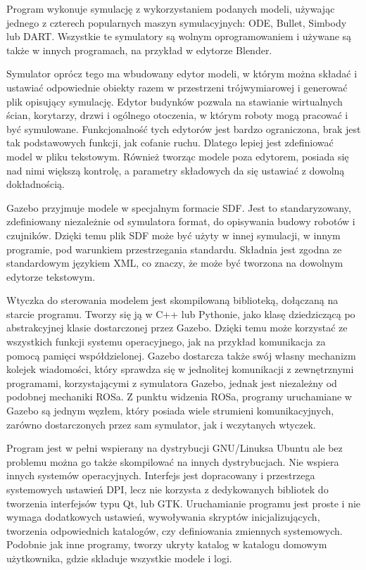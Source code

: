 	Program wykonuje symulację z wykorzystaniem podanych modeli, używając jednego z czterech popularnych maszyn symulacyjnych: ODE, Bullet, Simbody lub DART.
	Wszystkie te symulatory są wolnym oprogramowaniem i używane są także w innych programach, na przykład w edytorze Blender.

	Symulator oprócz tego ma wbudowany edytor modeli, w którym można składać i ustawiać odpowiednie obiekty razem w przestrzeni trójwymiarowej
	i generować plik opisujący symulację.
	Edytor budynków pozwala na stawianie wirtualnych ścian, korytarzy, drzwi i ogólnego otoczenia, w którym roboty mogą pracować i być symulowane.
	Funkcjonalność tych edytorów jest bardzo ograniczona, brak jest tak podstawowych funkcji, jak cofanie ruchu.
	Dlatego lepiej jest zdefiniować model w pliku tekstowym.
	Również tworząc modele poza edytorem, posiada się nad nimi większą kontrolę, a parametry składowych da się ustawiać z dowolną dokładnością.

	Gazebo przyjmuje modele w specjalnym formacie SDF. Jest to standaryzowany, zdefiniowany niezależnie od symulatora format, do opisywania budowy robotów i czujników.
	Dzięki temu plik SDF może być użyty w innej symulacji, w innym programie, pod warunkiem przestrzegania standardu.
	Składnia jest zgodna ze standardowym językiem XML, co znaczy, że może być tworzona na dowolnym edytorze tekstowym.

	Wtyczka do sterowania modelem jest skompilowaną biblioteką, dołączaną na starcie programu.
	Tworzy się ją w C++ lub Pythonie, jako klasę dziedziczącą po abstrakcyjnej klasie dostarczonej przez Gazebo.
	Dzięki temu może korzystać ze wszystkich funkcji systemu operacyjnego, jak na przykład komunikacja za pomocą pamięci współdzielonej.
	Gazebo dostarcza także swój własny mechanizm kolejek wiadomości, który sprawdza się w jednolitej komunikacji z zewnętrznymi programami, korzystającymi z symulatora Gazebo, jednak jest niezależny od podobnej mechaniki ROSa. Z punktu widzenia ROSa, programy uruchamiane w Gazebo są jednym węzłem, który posiada wiele strumieni komunikacyjnych,
	zarówno dostarczonych przez sam symulator, jak i wczytanych wtyczek.

	Program jest w pełni wspierany na dystrybucji GNU/Linuksa Ubuntu ale bez problemu można go także skompilować na innych dystrybucjach.
	Nie wspiera innych systemów operacyjnych.
	Interfejs jest dopracowany i przestrzega systemowych ustawień DPI, lecz nie korzysta z dedykowanych bibliotek do tworzenia 
	interfejsów typu Qt, lub GTK.
	Uruchamianie programu jest proste i nie wymaga dodatkowych ustawień, wywoływania skryptów inicjalizujących, 
	tworzenia odpowiednich katalogów, czy definiowania zmiennych systemowych.
	Podobnie jak inne programy, tworzy ukryty katalog w katalogu domowym użytkownika, gdzie składuje wszystkie modele i logi.

